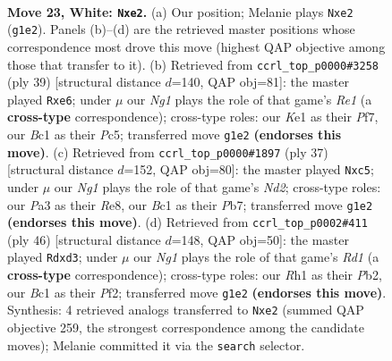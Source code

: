\documentclass[11pt]{article}
\begin{document}
\begin{figure}[p]
\label{fig:thought-m42}
\end{figure}

\clearpage

\begin{figure}[p]\centering
\begin{subfigure}{0.46\textwidth}\centering
\resizebox{\linewidth}{!}{%
\newchessgame
\chessboard[
  setfen={r3k1nr/b1q5/4p3/pp2Pp2/b1p2QPp/P7/RP1NnPP1/2B1K1NR w kq - 0 23},
  showmover=false,
  pgfstyle=straightmove, color=movearrow, markmove={g1-e2}
]}
\caption{}
\end{subfigure}\hfill
\begin{subfigure}{0.46\textwidth}\centering
\resizebox{\linewidth}{!}{%
\newchessgame
\chessboard[
  setfen={rn1qr1k1/5pp1/p2pN2p/P1pP4/1pb1P3/3B2P1/1P3PP1/R2QK2R b KQ - 1 20},
  showmover=false,
  pgfstyle=straightmove, color=movearrow, markmove={e8-e6}
]}
\caption{}
\end{subfigure}
\\[4pt]
\begin{subfigure}{0.46\textwidth}\centering
\resizebox{\linewidth}{!}{%
\newchessgame
\chessboard[
  setfen={r3r1k1/pp1n1pbn/q1p5/2N2pp1/1QpP4/6PP/PP3PB1/R1BR2K1 b - - 8 19},
  showmover=false,
  pgfstyle=straightmove, color=movearrow, markmove={d7-c5}
]}
\caption{}
\end{subfigure}\hfill
\begin{subfigure}{0.46\textwidth}\centering
\resizebox{\linewidth}{!}{%
\newchessgame
\chessboard[
  setfen={3r1b1k/1pqb1pp1/4p2p/p2pP3/3N2Q1/3nR2P/PP3PP1/3R2K1 w - - 0 24},
  showmover=false,
  pgfstyle=straightmove, color=movearrow, markmove={d1-d3}
]}
\caption{}
\end{subfigure}
\caption{\textbf{Move 23, White: \texttt{Nxe2}.} (a) Our position; Melanie plays \texttt{Nxe2} (\texttt{g1e2}). Panels (b)--(d) are the retrieved master positions whose correspondence most drove this move (highest QAP objective among those that transfer to it). (b) Retrieved from \texttt{ccrl\_top\_p0000\#3258} (ply 39) [structural distance $d$=140, QAP obj=81]: the master played \texttt{Rxe6}; under $\mu$ our \emph{Ng1} plays the role of that game's \emph{Re1} (a \textbf{cross-type} correspondence); cross-type roles: our \emph{K}e1 as their \emph{P}f7, our \emph{B}c1 as their \emph{P}c5; transferred move \texttt{g1e2} \textbf{(endorses this move)}. (c) Retrieved from \texttt{ccrl\_top\_p0000\#1897} (ply 37) [structural distance $d$=152, QAP obj=80]: the master played \texttt{Nxc5}; under $\mu$ our \emph{Ng1} plays the role of that game's \emph{Nd2}; cross-type roles: our \emph{P}a3 as their \emph{R}e8, our \emph{B}c1 as their \emph{P}b7; transferred move \texttt{g1e2} \textbf{(endorses this move)}. (d) Retrieved from \texttt{ccrl\_top\_p0002\#411} (ply 46) [structural distance $d$=148, QAP obj=50]: the master played \texttt{Rdxd3}; under $\mu$ our \emph{Ng1} plays the role of that game's \emph{Rd1} (a \textbf{cross-type} correspondence); cross-type roles: our \emph{R}h1 as their \emph{P}b2, our \emph{B}c1 as their \emph{P}f2; transferred move \texttt{g1e2} \textbf{(endorses this move)}. Synthesis: 4 retrieved analogs transferred to \texttt{Nxe2} (summed QAP objective 259, the strongest correspondence among the candidate moves); Melanie committed it via the \texttt{search} selector.}

\end{figure}
\end{document}
